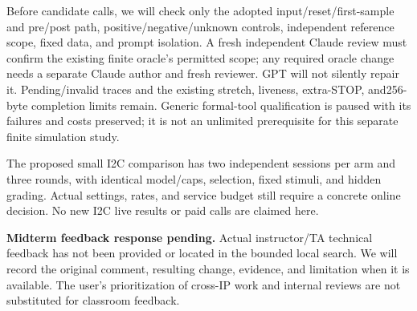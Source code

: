 \documentclass[conference,10pt,letterpaper]{IEEEtran}
\begin{document}
Before candidate calls, we will check only the adopted input/reset/first-sample
and pre/post path, positive/negative/unknown controls, independent reference
scope, fixed data, and prompt isolation. A fresh independent Claude review must
confirm the existing finite oracle's permitted scope; any required oracle
change needs a separate Claude author and fresh reviewer. GPT will not silently
repair it. Pending/invalid traces and the existing stretch, liveness, extra-STOP,
and256-byte completion limits remain. Generic formal-tool qualification is
paused with its failures and costs preserved; it is not an unlimited prerequisite
for this separate finite simulation study.

The proposed small I2C comparison has two independent sessions per arm and three
rounds, with identical model/caps, selection, fixed stimuli, and hidden grading.
Actual settings, rates, and service budget still require a concrete online
decision. No new I2C live results or paid calls are claimed here.

\textbf{Midterm feedback response pending.} Actual instructor/TA technical
feedback has not been provided or located in the bounded local search. We will
record the original comment, resulting change, evidence, and limitation when it
is available. The user's prioritization of cross-IP work and internal reviews
are not substituted for classroom feedback.
\end{document}
